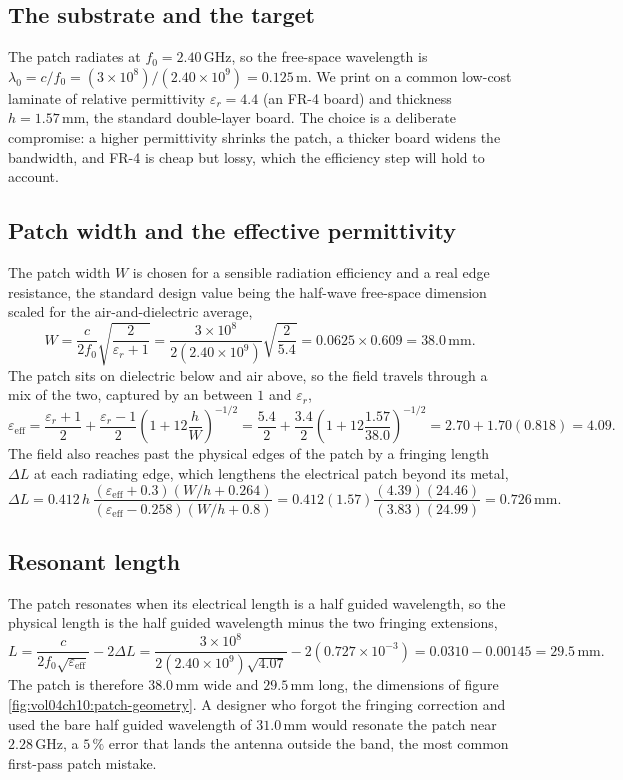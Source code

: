 \subsection{The substrate and the target}

The patch radiates at $f_0 = 2.40\,\si{\giga\hertz}$, so the free-space
wavelength is $\lambda_0 = c/f_0 = (3\times 10^{8})/(2.40\times 10^{9}) =
0.125\,\si{\meter}$. We print on a common low-cost laminate of relative
permittivity $\varepsilon_r = 4.4$ (an FR-4 board) and thickness $h =
1.57\,\si{\milli\meter}$, the standard double-layer board. The choice is
a deliberate compromise: a higher permittivity shrinks the patch, a
thicker board widens the bandwidth, and FR-4 is cheap but lossy, which
the efficiency step will hold to account.

\subsection{Patch width and the effective permittivity}

The patch width $W$ is chosen for a sensible radiation efficiency and a
real edge resistance, the standard design value being the half-wave
free-space dimension scaled for the air-and-dielectric average,
\[
W = \frac{c}{2 f_0}\sqrt{\frac{2}{\varepsilon_r + 1}} =
\frac{3\times 10^{8}}{2(2.40\times 10^{9})}\sqrt{\frac{2}{5.4}} =
0.0625\times 0.609 = 38.0\,\si{\milli\meter}.
\]
The patch sits on dielectric below and air above, so the field travels
through a mix of the two, captured by an  between $1$ and $\varepsilon_r$,
\[
\varepsilon_{\text{eff}} = \frac{\varepsilon_r + 1}{2} +
\frac{\varepsilon_r - 1}{2}\left(1 + 12\frac{h}{W}\right)^{-1/2} =
\frac{5.4}{2} + \frac{3.4}{2}\left(1 + 12\frac{1.57}{38.0}\right)^{-1/2}
= 2.70 + 1.70(0.818) = 4.09.
\]
The field also reaches past the physical edges of the patch by a
fringing length $\Delta L$ at each radiating edge, which lengthens the
electrical patch beyond its metal,
\[
\Delta L = 0.412\,h\,\frac{(\varepsilon_{\text{eff}} + 0.3)(W/h + 0.264)}
{(\varepsilon_{\text{eff}} - 0.258)(W/h + 0.8)} = 0.412(1.57)
\frac{(4.39)(24.46)}{(3.83)(24.99)} = 0.726\,\si{\milli\meter}.
\]

\subsection{Resonant length}

The patch resonates when its electrical length is a half guided
wavelength, so the physical length is the half guided wavelength minus
the two fringing extensions,
\[
L = \frac{c}{2 f_0\sqrt{\varepsilon_{\text{eff}}}} - 2\Delta L =
\frac{3\times 10^{8}}{2(2.40\times 10^{9})\sqrt{4.07}} -
2(0.727\times 10^{-3}) = 0.0310 - 0.00145 = 29.5\,\si{\milli\meter}.
\]
The patch is therefore $38.0\,\si{\milli\meter}$ wide and $29.5\,\si{
\milli\meter}$ long, the dimensions of figure
\ref{fig:vol04ch10:patch-geometry}. A designer who forgot the fringing
correction and used the bare half guided wavelength of $31.0\,\si{\milli
\meter}$ would resonate the patch near $2.28\,\si{\giga\hertz}$, a
$5\,\%$ error that lands the antenna outside the band, the most common
first-pass patch mistake.

